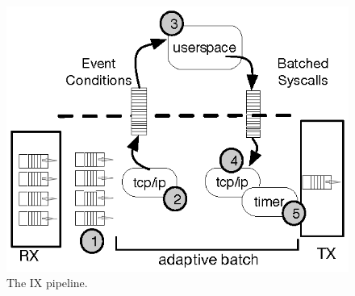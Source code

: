 \begin{figure}
\centering\includegraphics{figs/pipeline}
\caption{The IX pipeline.}
\label{fig:queues-cores}
\end{figure}

